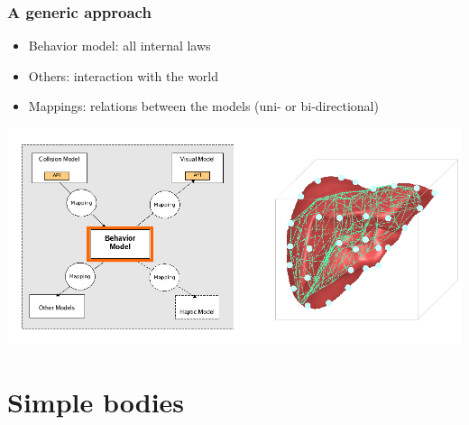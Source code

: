 \documentclass[a4paper,compress]{beamer}
\begin{document}
\begin{frame}
\frametitle{A generic approach}
\begin{itemize}
\item Behavior model: all internal laws
\item Others: interaction with the world
\item Mappings: relations between the models (uni- or bi-directional)
\end{itemize}
\begin{center}
 \includegraphics[width=\linewidth]{multimodal.png}
\end{center}

\end{frame}



\section{Simple bodies}
\end{document}
